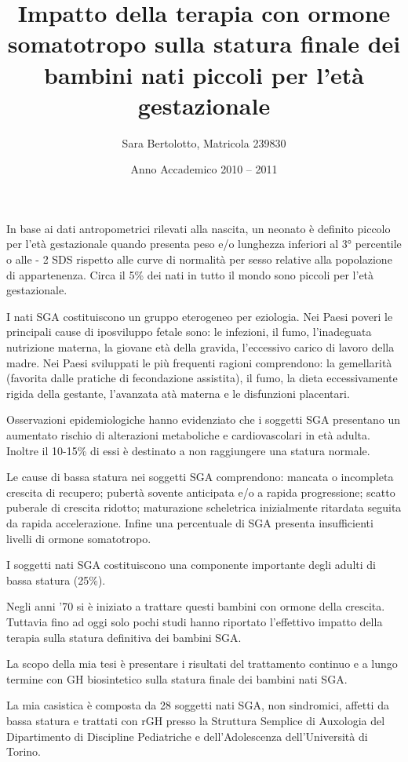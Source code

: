 \documentclass[12pt,a4paper]{article}
\author{Sara Bertolotto, Matricola 239830}
\title{Impatto della terapia con ormone somatotropo sulla statura finale dei bambini nati piccoli per l'età gestazionale}
\date{Anno Accademico 2010 -- 2011}
\begin{document}
\maketitle
In base ai dati antropometrici rilevati alla nascita, un neonato è definito piccolo per l'età gestazionale quando presenta peso e/o lunghezza inferiori al 3° percentile o alle - 2 SDS rispetto alle curve di normalità per sesso relative alla popolazione di appartenenza. Circa il 5\% dei nati in tutto il mondo sono piccoli per l'età gestazionale. 

I nati SGA costituiscono un gruppo eterogeneo per eziologia. Nei Paesi poveri le principali cause di iposviluppo fetale sono: le infezioni, il fumo, l'inadeguata nutrizione materna, la giovane età della gravida, l'eccessivo carico di lavoro della madre. Nei Paesi sviluppati le più frequenti ragioni comprendono: la gemellarità (favorita dalle pratiche di fecondazione assistita), il fumo, la dieta eccessivamente rigida della gestante, l'avanzata atà materna e le disfunzioni placentari.

Osservazioni epidemiologiche hanno evidenziato che i soggetti SGA presentano un aumentato rischio di alterazioni metaboliche e cardiovascolari in età adulta. Inoltre il 10-15\% di essi è destinato a non raggiungere una statura normale.

Le cause di bassa statura nei soggetti SGA comprendono: mancata o incompleta crescita di recupero; pubertà sovente anticipata e/o a rapida progressione; scatto puberale di crescita ridotto; maturazione scheletrica inizialmente ritardata seguita da rapida accelerazione. Infine una percentuale di SGA presenta insufficienti livelli di ormone somatotropo.

I soggetti nati SGA costituiscono una componente importante degli adulti di bassa statura (25\%).

Negli anni '70 si è iniziato a trattare questi bambini con ormone della crescita. Tuttavia fino ad oggi solo pochi studi hanno riportato l'effettivo impatto della terapia sulla statura definitiva dei bambini SGA.

La scopo della mia tesi è presentare i risultati del trattamento continuo e a lungo termine con GH  biosintetico sulla statura finale dei bambini nati SGA.

La mia casistica è composta da 28 soggetti nati SGA, non sindromici, affetti da bassa statura e trattati con rGH presso la Struttura Semplice di Auxologia del Dipartimento di Discipline Pediatriche e dell'Adolescenza dell'Università di Torino.
\end{document}
